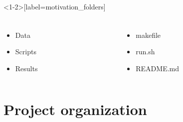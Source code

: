 \documentclass[xcolor=dvipsnames,xcolor=table, 14p]{beamer}
\begin{document}
\begin{frame}<1-2>[label=motivation_folders]\frametitle{%
    }
    \begin{columns}
        \centering
        \begin{column}{0.33\textwidth}
            \begin{itemize}
                \item Data
                \item Scripts
                \item Results
            \end{itemize}
        \end{column}
        \begin{column}{0.33\textwidth}
            \begin{itemize}
                \item makefile
                \item run.sh
                \item README.md
            \end{itemize}
        \end{column}
    \end{columns}
\end{frame}


\section{Project organization}

\end{document}
